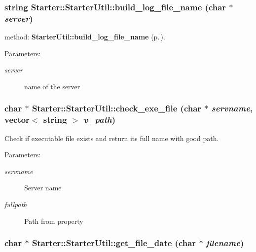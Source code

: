 \subsubsection{\setlength{\rightskip}{0pt plus 5cm}string Starter::Starter\-Util::build\_\-log\_\-file\_\-name (char $\ast$ {\em server})}\label{classStarter_1_1StarterUtil_z8_3}


method: {\bf Starter\-Util::build\_\-log\_\-file\_\-name} {\rm (p.\,\pageref{classStarter_1_1StarterUtil_z8_3})}.

\begin{Desc}
\item[Parameters: ]\par
\begin{description}
\item[{\em 
server}]name of the server \end{description}
\end{Desc}
\subsubsection{\setlength{\rightskip}{0pt plus 5cm}char $\ast$ Starter::Starter\-Util::check\_\-exe\_\-file (char $\ast$ {\em servname}, vector$<$ string $>$ {\em v\_\-path})}\label{classStarter_1_1StarterUtil_z8_2}


Check if executable file exists and return its full name with good path.

\begin{Desc}
\item[Parameters: ]\par
\begin{description}
\item[{\em 
servname}]Server name \item[{\em 
fullpath}]Path from property \end{description}
\end{Desc}
\subsubsection{\setlength{\rightskip}{0pt plus 5cm}char $\ast$ Starter::Starter\-Util::get\_\-file\_\-date (char $\ast$ {\em filename})}\label{classStarter_1_1StarterUtil_z8_4}


